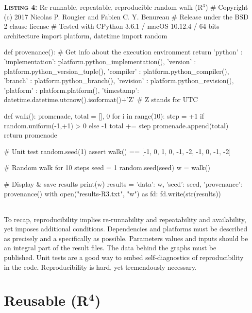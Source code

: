 \documentclass[a4paper,11pt]{article}
\begin{document}
\noindent \begin{minipage}[c]{\linewidth}
\begin{code}{\textbf{\textsc{Listing 4:}} Re-runnable, repeatable, reproducible random walk (R$^3$)}
# Copyright (c) 2017 Nicolas P. Rougier and Fabien C. Y. Benureau
# Release under the BSD 2-clause license
# Tested with CPython 3.6.1 / macOS 10.12.4 / 64 bits architecture
import platform, datetime
import random

def provenance(): # Get info about the execution environment
    return {'python'   : {'implementation': platform.python_implementation(),
                          'version'       : platform.python_version_tuple(),
                          'compiler'      : platform.python_compiler(),
                          'branch'        : platform.python_branch(),
                          'revision'      : platform.python_revision()},
            'platform' : platform.platform(),
            'timestamp': datetime.datetime.utcnow().isoformat()+'Z'}  # Z stands for UTC

def walk():
    promenade, total = [], 0
    for i in range(10):
        step = +1 if random.uniform(-1,+1) > 0 else -1
        total += step
        promenade.append(total)
    return promenade

# Unit test
random.seed(1)
assert walk() == [-1, 0, 1, 0, -1, -2, -1, 0, -1, -2]

# Random walk for 10 steps
seed = 1
random.seed(seed)
w = walk()

# Display & save results
print(w)
results = {'data': w, 'seed': seed, 'provenance': provenance()}
with open("results-R3.txt", "w") as fd:
    fd.write(str(results))
\end{code}
\end{minipage}\\

To recap, reproducibility implies re-runnability and repeatability and availability, yet imposes additional conditions. Dependencies and platforms must be described as precisely and a specifically as possible. Parameters values and inputs should be an integral part of the result files. The data behind the graphs must be published. Unit tests are a good way to embed self-diagnostics of reproducibility in the code. Reproducibility is hard, yet tremendously necessary.


\section*{Reusable (R$^{\mathbf 4}$)}
\end{document}
